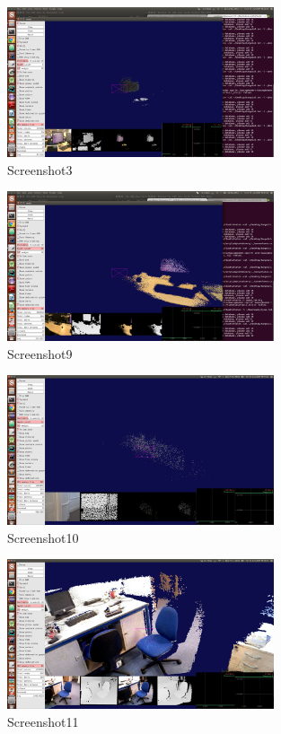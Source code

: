 \documentclass[12pt,twoside]{article}
\begin{document}
\begin{figure}[h]
    \centering
    \includegraphics[width=0.7\textwidth]{figures/Screenshot3}
    \caption{Screenshot3}
    \label{fig:Screenshot3}
\end{figure}

\begin{figure}[h]
    \centering
    \includegraphics[width=0.7\textwidth]{figures/Screenshot9}
    \caption{Screenshot9}
    \label{fig:Screenshot9}
\end{figure}


\begin{figure}[h]
    \centering
    \includegraphics[width=0.7\textwidth]{figures/Screenshot10}
    \caption{Screenshot10}
    \label{fig:Screenshot10}
\end{figure}

\begin{figure}[h]
    \centering
    \includegraphics[width=0.7\textwidth]{figures/Screenshot11}
    \caption{Screenshot11}
    \label{fig:Screenshot11}
\end{figure}
\end{document}
